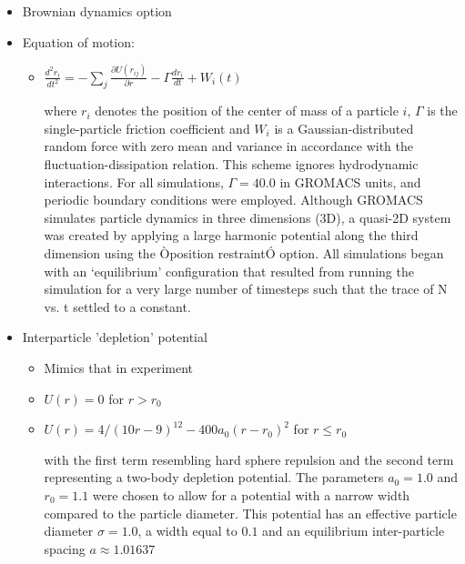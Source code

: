 \documentclass[11pt]{article}
\begin{document}
\begin{itemize}

\item Brownian dynamics option\\
\label{sec-2.3.3.1}


\item Equation of motion:\\
\label{sec-2.3.3.2}

\begin{itemize}

\item $\frac{d^2 r_i}{dt^2}  = - \sum_j \frac{\partial{U(r_{ij})}}{{\partial r}}  - \Gamma  \frac{d r_i}{dt} + W_i (t)$\\
\label{sec-2.3.3.2.1}

      where $r_i$ denotes the position of the center of mass of a particle $i$, $\Gamma$ is the single-particle friction coefficient and $W_i$ is a Gaussian-distributed random force with zero mean and variance in accordance with the fluctuation-dissipation relation.  This scheme ignores hydrodynamic interactions. For all simulations, $\Gamma=40.0$ in GROMACS units, and periodic boundary conditions were employed. Although GROMACS simulates particle dynamics in three dimensions (3D), a quasi-2D system was created by applying a large harmonic potential along the third dimension using the Òposition restraintÓ option. All simulations began with an `equilibrium' configuration that resulted from running the simulation for a very large number of timesteps such that the trace of N vs. t settled to a constant.
\end{itemize} %

\item Interparticle 'depletion' potential\\
\label{sec-2.3.3.3}

\begin{itemize}

\item Mimics that in experiment\\
\label{sec-2.3.3.3.1}


\item $U(r)=0$ for $r > r_0$\\
\label{sec-2.3.3.3.2}


\item $U(r)=4/(10r-9)^{12} -  400 a_0 (r-r_0)^2$ for $r \le r_0$\\
\label{sec-2.3.3.3.3}

with the first term resembling hard sphere repulsion and the second term  representing a two-body depletion potential. The parameters $a_0=1.0$ and $r_0=1.1$ were chosen to allow for  a potential with a narrow width compared to the particle diameter. This potential has an effective particle diameter $\sigma=1.0$,  a width equal to $0.1$ and an equilibrium inter-particle spacing $a \approx 1.01637$
\end{itemize} %


\end{itemize}
\end{document}
